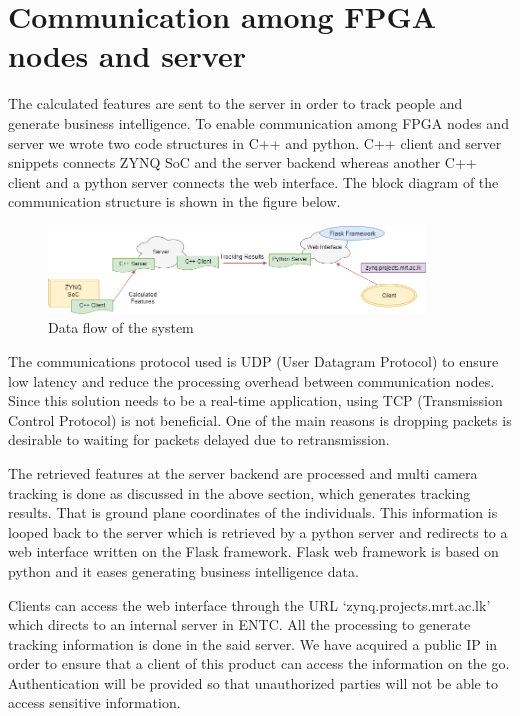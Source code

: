 \documentclass[12pt,a4paper]{report}
\begin{document}
\section{Communication among FPGA nodes and server}
The calculated features are sent to the server in order to track people and generate business intelligence. To enable communication among FPGA nodes and server we wrote two code structures in C++ and python. C++ client and server snippets connects ZYNQ SoC and the server backend whereas another C++ client and a python server connects the web interface. The block diagram of the communication structure is shown in the figure below.
\begin{figure}[H]
\includegraphics[width=10cm]{comm.png}
\centering
\caption{Data flow of the system}
\label{comm}
\end{figure}

\par The communications protocol used is UDP (User Datagram Protocol) to ensure low latency and reduce the processing overhead between communication nodes. Since this solution needs to be a real-time application, using TCP (Transmission Control Protocol) is not beneficial. One of the main reasons is dropping packets is desirable to waiting for packets delayed due to retransmission.
\par The retrieved features at the server backend are processed and multi camera tracking is done as discussed in the above section, which generates tracking results. That is ground plane coordinates of the individuals. This information is looped back to the server which is retrieved by a python server and redirects to a web interface written on the Flask framework. Flask web framework is based on python and it eases generating business intelligence data.
\par Clients can access the web interface through the URL ‘zynq.projects.mrt.ac.lk’ which directs to an internal server in ENTC. All the processing to generate tracking information is done in the said server. We have acquired a public IP in order to ensure that a client of this product can access the information on the go. Authentication will be provided so that unauthorized parties will not be able to access sensitive information.
\end{document}

